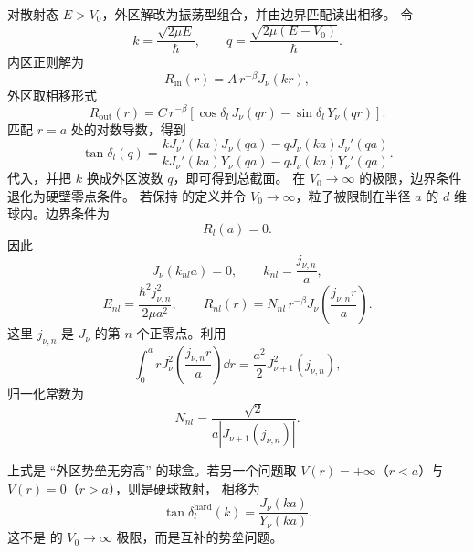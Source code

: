 对散射态 $E>V_0$，外区解改为振荡型组合，并由边界匹配读出相移。
令
\begin{equation}
	k=\frac{\sqrt{2\mu E}}{\hbar},\qquad
	q=\frac{\sqrt{2\mu(E-V_0)}}{\hbar}.
\end{equation}
内区正则解为
\begin{equation}
	R_{\mathrm{in}}(r)=A\,r^{-\beta}J_\nu(kr),
\end{equation}
外区取相移形式
\begin{equation}
	R_{\mathrm{out}}(r)=C\,r^{-\beta}
	\left[\cos\delta_l\,J_\nu(qr)-\sin\delta_l\,Y_\nu(qr)\right].
\end{equation}
匹配 \(r=a\) 处的对数导数，得到
\begin{equation}
	\tan\delta_l(q)
	=
	\frac{
		kJ_\nu'(ka)J_\nu(qa)-qJ_\nu(ka)J_\nu'(qa)
	}{
		kJ_\nu'(ka)Y_\nu(qa)-qJ_\nu(ka)Y_\nu'(qa)
	}.
	\label{eq:phys-hdqm-finite-well-phase-shift}
\end{equation}
代入，并把 \(k\) 换成外区波数 \(q\)，即可得到总截面。
在 $V_0\to\infty$ 的极限，边界条件退化为硬壁零点条件。
若保持 的定义并令 \(V_0\to\infty\)，粒子被限制在半径 \(a\) 的 \(d\) 维球内。边界条件为
\begin{equation}
	R_l(a)=0.
\end{equation}
因此
\begin{equation}
	J_\nu(k_{nl}a)=0,\qquad
	k_{nl}=\frac{j_{\nu,n}}{a},
\end{equation}
\begin{equation}
	E_{nl}=\frac{\hbar^2j_{\nu,n}^2}{2\mu a^2},\qquad
	R_{nl}(r)=N_{nl}\,r^{-\beta}J_\nu\left(\frac{j_{\nu,n}r}{a}\right).
	\label{eq:phys-hdqm-infinite-ball}
\end{equation}
这里 \(j_{\nu,n}\) 是 \(J_\nu\) 的第 \(n\) 个正零点。利用
\begin{equation}
	\int_0^a rJ_\nu^2\left(\frac{j_{\nu,n}r}{a}\right)\dd r
	=\frac{a^2}{2}J_{\nu+1}^2(j_{\nu,n}),
\end{equation}
归一化常数为
\begin{equation}
	N_{nl}=\frac{\sqrt{2}}{a|J_{\nu+1}(j_{\nu,n})|}.
\end{equation}
\begin{note}
	上式是 ``外区势垒无穷高'' 的球盒。若另一个问题取
	\(V(r)=+\infty\)（\(r<a\)）与 \(V(r)=0\)（\(r>a\)），则是硬球散射，
	相移为
	\begin{equation}
		\tan\delta_l^{\mathrm{hard}}(k)=\frac{J_\nu(ka)}{Y_\nu(ka)}.
	\end{equation}
	这不是 的 \(V_0\to\infty\) 极限，而是互补的势垒问题。
\end{note}
